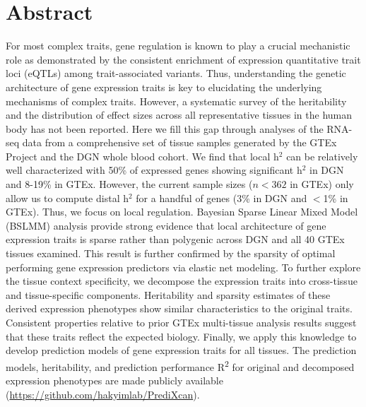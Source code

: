 \documentclass[10pt,letterpaper]{article}
\begin{document}
\pagebreak{}

\section*{Abstract}
For most complex traits, gene regulation is known to play a crucial mechanistic role as demonstrated by the consistent enrichment of expression quantitative trait loci (eQTLs) among trait-associated variants. Thus, understanding the genetic architecture of gene expression traits is key to elucidating the underlying mechanisms of complex traits. However, a systematic survey of the heritability and the distribution of effect sizes across all representative tissues in the human body has not been reported. Here we fill this gap through analyses of the RNA-seq data from a comprehensive set of tissue samples generated by the GTEx Project and the DGN whole blood cohort. We find that local h$^2$ can be relatively well characterized with 50\% of expressed genes showing significant h$^2$ in DGN and 8-19\% in GTEx. However, the current sample sizes ($n<362$ in GTEx) only allow us to compute distal h$^2$ for a handful of genes (3\% in DGN and $<$1\% in GTEx). Thus, we focus on local regulation. Bayesian Sparse Linear Mixed Model (BSLMM) analysis provide strong evidence that local architecture of gene expression traits is sparse rather than polygenic across DGN and all 40 GTEx tissues examined. This result is further confirmed by the sparsity of optimal performing gene expression predictors via elastic net modeling. To further explore the tissue context specificity, we decompose the expression traits into cross-tissue and tissue-specific components. Heritability and sparsity estimates of these derived expression phenotypes show similar characteristics to the original traits. Consistent properties relative to prior GTEx multi-tissue analysis results suggest that these traits reflect the expected biology. Finally, we apply this knowledge to develop prediction models of gene expression traits for all tissues. The prediction models, heritability, and prediction performance R\textsuperscript{2} for original and decomposed expression phenotypes are made publicly available (\url{https://github.com/hakyimlab/PrediXcan}).


\end{document}
